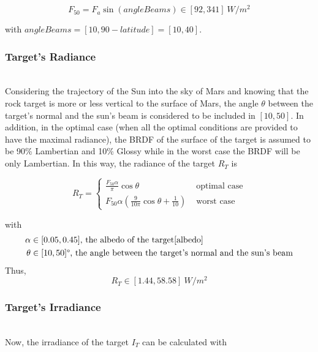 \begin{equation}
F_{50} = F_a\sin(angleBeams) \in [92, 341] \ W/m^2
\end{equation}

with $angleBeams = [10, 90-latitude] = [10, 40]$\textdegree.

\subsubsection{Target's Radiance}
~\\
Considering the trajectory of the Sun into the sky of Mars and knowing that the rock target is more or less vertical to the surface of Mars, the angle $\theta$ between the target's normal and the sun's beam is considered to be included in $[10, 50]$\textdegree. In addition, in the optimal case (when all the optimal conditions are provided to have the maximal radiance), the BRDF of the surface of the target is assumed to be 90\% Lambertian and 10\% Glossy while in the worst case the BRDF will be only Lambertian. In this way, the radiance of the target $R_T$ is

\begin{equation}
\label{eq:Radiance Target}
R_T = \left\{
	\begin{array}{ll}
		\frac{F_{50}\alpha}{\pi}\cos \theta & \mbox{ optimal case} \\
		F_{50}\alpha(\frac{9}{10\pi}\cos\theta + \frac{1}{10}) & \mbox{ worst case}
	\end{array}
\right.
\end{equation}

with 
\begin{align*}
	\alpha & \in [0.05, 0.45]\mbox{, the albedo of the target\ref{albedo}} \\
	\theta & \in [10, 50]\mbox{\textdegree, the angle between the target's normal and the sun's beam}
\end{align*}
Thus, 
\begin{equation}
\label{eq:Radiance Target Range}
R_T \in [1.44, 58.58] \ W/m^2
\end{equation}





\subsubsection{Target's Irradiance}
\label{Target's Irradiance}
~\\
Now, the irradiance of the target $I_T$ can be calculated with

